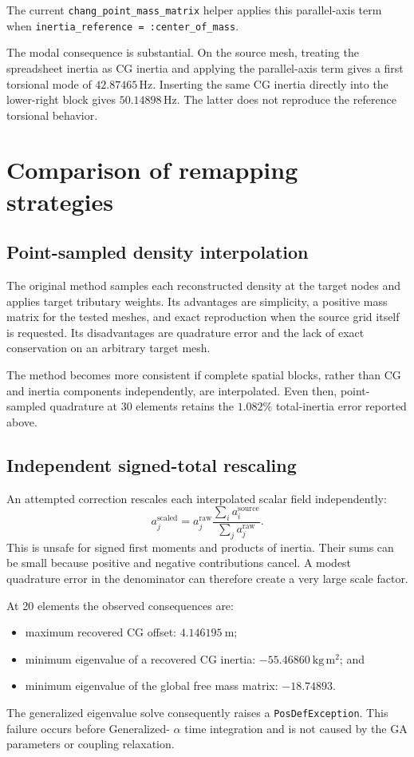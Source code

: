 \documentclass[11pt,a4paper]{article}
\newcommand{\Hz}{\,\mathrm{Hz}}
\begin{document}
The current \texttt{chang\_point\_mass\_matrix} helper applies this
parallel-axis term when
\texttt{inertia\_reference = :center\_of\_mass}.

The modal consequence is substantial.  On the source mesh, treating the
spreadsheet inertia as CG inertia and applying the parallel-axis term gives a
first torsional mode of \(42.87465\Hz\).  Inserting the same CG inertia
directly into the lower-right block gives \(50.14898\Hz\).  The latter does
not reproduce the reference torsional behavior.

\section{Comparison of remapping strategies}

\subsection{Point-sampled density interpolation}

The original method samples each reconstructed density at the target nodes
and applies target tributary weights.  Its advantages are simplicity, a
positive mass matrix for the tested meshes, and exact reproduction when the
source grid itself is requested.  Its disadvantages are quadrature error and
the lack of exact conservation on an arbitrary target mesh.

The method becomes more consistent if complete spatial blocks, rather than
CG and inertia components independently, are interpolated.  Even then,
point-sampled quadrature at 30 elements retains the \(1.082\%\) total-inertia
error reported above.

\subsection{Independent signed-total rescaling}

An attempted correction rescales each interpolated scalar field independently:
\begin{equation}
a_j^{\mathrm{scaled}} = a_j^{\mathrm{raw}}
\frac{\sum_i a_i^{\mathrm{source}}}
     {\sum_j a_j^{\mathrm{raw}}}.
\end{equation}
This is unsafe for signed first moments and products of inertia.  Their sums
can be small because positive and negative contributions cancel.  A modest
quadrature error in the denominator can therefore create a very large scale
factor.

At 20 elements the observed consequences are:
\begin{itemize}
  \item maximum recovered CG offset: \(4.146195\ \mathrm{m}\);
  \item minimum eigenvalue of a recovered CG inertia:
        \(-55.46860\ \mathrm{kg\,m^2}\); and
  \item minimum eigenvalue of the global free mass matrix:
        \(-18.74893\).
\end{itemize}
The generalized eigenvalue solve consequently raises a
\texttt{PosDefException}.  This failure occurs before Generalized-
\(\alpha\) time integration and is not caused by the GA parameters or
coupling relaxation.
\end{document}

